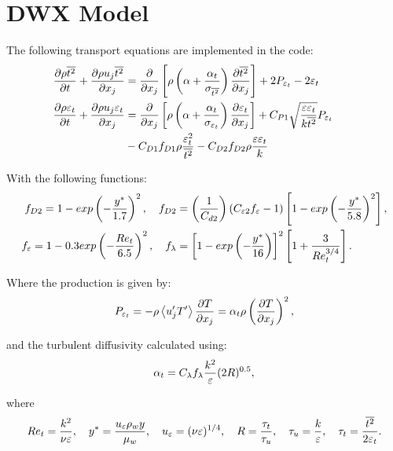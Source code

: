 

\section{DWX Model}
The following transport equations are implemented in the code:
\begin{equation} \label{eq:ktDeng}
\begin{split}
\frac{\partial \rho \overline{t^2}}{\partial t} + \frac{\partial \rho u_j \overline{t^2}}{\partial x_j} &= \frac{\partial}{\partial x_j}\left[\rho \left(\alpha + \frac{\alpha_t}{\sigma_{\overline{t^2}}}\right)\frac{\partial \overline{t^2}}{\partial x_j}\right] + 2 P_{{\varepsilon}_t}- 2 \varepsilon_t \\
\frac{\partial \rho \varepsilon_t}{\partial t} + \frac{\partial \rho u_j \varepsilon_t}{\partial x_j} &= \frac{\partial}{\partial x_j}\left[\rho \left(\alpha + \frac{\alpha_t}{\sigma_{\varepsilon_t}}\right)\frac{\partial \varepsilon_t}{\partial x_j}\right] + C_{P1}\sqrt{\frac{{\varepsilon}{\varepsilon}_t}{k\overline{t^2}}} P_{{\varepsilon}_t} \qquad \\ &- C_{D1} f_{D1}\rho\frac{{\varepsilon}_t^2}{\overline{t^2}}  - C_{D2} f_{D2}\rho\frac{{\varepsilon}{\varepsilon}_t}{k}   
\end{split}
\end{equation}

With the following functions:
\begin{equation}
\begin{split}
f_{D2} = 1-exp\left(-\frac{y^*}{1.7}\right)^2,\quad f_{D2} &= \left(\frac{1}{C_{d2}}\right)(C_{{\varepsilon}2}f_{\varepsilon}-1)\left[1-exp\left(-\frac{y^*}{5.8}\right)^2\right], \\
f_{\varepsilon} = 1-0.3exp\left(-\frac{Re_t}{6.5}\right)^2, \quad f_\lambda &= \left[1-exp\left(-\frac{y^*}{16}\right)\right]^2\left[1+\frac{3}{Re_t^{3/4}}\right].
\end{split}
\end{equation}

Where the production is given by:
\begin{equation}
P_{{\varepsilon}_t}=-\rho \left<{u'_j T'}\right> \frac{\partial T}{ \partial x_j}= \alpha_t \rho \left(\frac{ \partial T}{\partial x_j}\right)^2,
\end{equation} 

and the turbulent diffusivity calculated using:
\begin{equation}
\alpha_t = C_\lambda f_\lambda \frac{k^2}{{\varepsilon}}(2R)^{0.5},
\end{equation} 

where
\begin{equation}
Re_t = \frac{k^2}{\nu\varepsilon}, \quad y^*= \frac{u_\varepsilon \rho_w y}{\mu_w}, \quad u_\varepsilon = (\nu\varepsilon)^{1/4}, \quad R = \frac{\tau_t}{\tau_u}, \quad \tau_u = \frac{k}{{\varepsilon}}, \quad \tau_t = \frac{\overline{t^2}}{2{\varepsilon}_t}.
\end{equation}

